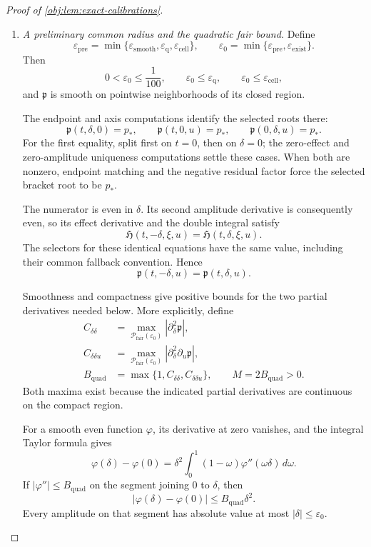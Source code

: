\documentclass[11pt]{article}
\begin{document}
\begin{proof}[Proof of \cref{obj:lem:exact-calibrations}]
\begin{enumerate}
\item \emph{A preliminary common radius and the quadratic fair bound.}
Define
\[
\varepsilon_{\mathrm{pre}}
=
\min\{\varepsilon_{\mathrm{smooth}},
      \varepsilon_{\mathrm q},
      \varepsilon_{\mathrm{cell}}\},
\qquad
\varepsilon_0
=
\min\{\varepsilon_{\mathrm{pre}},
      \varepsilon_{\mathrm{exist}}\}.
\]
Then
\[
0<\varepsilon_0\le\frac1{100},
\qquad
\varepsilon_0\le\varepsilon_{\mathrm q},
\qquad
\varepsilon_0\le\varepsilon_{\mathrm{cell}},
\]
and \(\mathfrak p\) is smooth on pointwise neighborhoods of its closed region.

The endpoint and axis computations identify the selected roots there:
\[
\mathfrak p(t,\delta,0)=p_*,
\qquad
\mathfrak p(t,0,u)=p_*,
\qquad
\mathfrak p(0,\delta,u)=p_*.
\]
For the first equality, split first on \(t=0\), then on \(\delta=0\); the zero-effect and zero-amplitude uniqueness computations settle these cases. When both are nonzero, endpoint matching and the negative residual factor force the selected bracket root to be \(p_*\).

The numerator is even in \(\delta\). Its second amplitude derivative is consequently even, so its effect derivative and the double integral satisfy
\[
\mathfrak H(t,-\delta,\xi,u)=\mathfrak H(t,\delta,\xi,u).
\]
The selectors for these identical equations have the same value, including their common fallback convention. Hence
\[
\mathfrak p(t,-\delta,u)=\mathfrak p(t,\delta,u).
\]

Smoothness and compactness give positive bounds for the two partial derivatives needed below. More explicitly, define
\[
\begin{aligned}
C_{\delta\delta}
&=
\max_{\mathcal P_{\mathrm{fair}}(\varepsilon_0)}
|\partial_\delta^2\mathfrak p|,\\
C_{\delta\delta u}
&=
\max_{\mathcal P_{\mathrm{fair}}(\varepsilon_0)}
|\partial_\delta^2\partial_u\mathfrak p|,\\
B_{\mathrm{quad}}
&=\max\{1,C_{\delta\delta},C_{\delta\delta u}\},
\qquad M=2B_{\mathrm{quad}}>0.
\end{aligned}
\]
Both maxima exist because the indicated partial derivatives are continuous on the compact region.

For a smooth even function \(\varphi\), its derivative at zero vanishes, and the integral Taylor formula gives
\[
\varphi(\delta)-\varphi(0)
=
\delta^2\int_0^1(1-\omega)\varphi''(\omega\delta)\,d\omega.
\]
If \(|\varphi''|\le B_{\mathrm{quad}}\) on the segment joining \(0\) to \(\delta\), then
\[
|\varphi(\delta)-\varphi(0)|
\le B_{\mathrm{quad}}\delta^2.
\]
Every amplitude on that segment has absolute value at most
\(|\delta|\le\varepsilon_0\).


\end{enumerate}
\end{proof}
\end{document}
